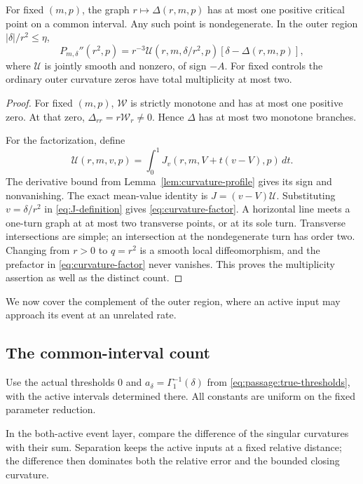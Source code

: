 \begin{proposition}\label{prop:one-fold-graph}
For fixed \((m,p)\), the graph \(r\mapsto\Delta(r,m,p)\) has at most
one positive critical point on a common interval. Any such point
is nondegenerate. In the outer region \(|\delta|/r^2\le\eta\),
\begin{equation}\label{eq:curvature-factor}
 P_{m,\delta}''(r^2,p)
 =r^{-3}\mathcal U(r,m,\delta/r^2,p)
                  [\delta-\Delta(r,m,p)],
\end{equation}
where \(\mathcal U\) is jointly smooth and nonzero, of sign \(-A\).
For fixed controls the ordinary outer curvature zeros have total
multiplicity at most two.
\end{proposition}

\begin{proof}
For fixed \((m,p)\), \(\mathcal W\) is strictly monotone and has
at most one positive zero. At that zero,
\(\Delta_{rr}=r\mathcal W_r\ne0\). Hence \(\Delta\) has at most
two monotone branches.

For the factorization, define
\[
 \mathcal U(r,m,v,p)
  =\int_0^1J_v(r,m,V+t(v-V),p)\,dt .
\]
The derivative bound from Lemma~\ref{lem:curvature-profile}
gives its sign and nonvanishing. The exact mean-value identity is
\(J=(v-V)\mathcal U\). Substituting
\(v=\delta/r^2\) in \eqref{eq:J-definition} gives
\eqref{eq:curvature-factor}.
A horizontal line meets a one-turn graph at at most two transverse
points, or at its sole turn. Transverse intersections are simple;
an intersection at the nondegenerate turn has order two.
Changing from \(r>0\) to \(q=r^2\) is a smooth local diffeomorphism,
and the prefactor in \eqref{eq:curvature-factor} never vanishes.
This proves the multiplicity assertion as well as the distinct count.
\end{proof}

We now cover the complement of the outer region, where an active input
may approach its event at an unrelated rate.

\subsection{The common-interval count}\label{sec:inner}

Use the actual thresholds $0$ and $a_\delta=\Gamma_1^{-1}(\delta)$
from \eqref{eq:passage:true-thresholds}, with the active intervals determined
there. All constants are uniform on the fixed parameter reduction.

In the both-active event layer, compare the difference of the singular
curvatures with their sum. Separation keeps the active inputs at a fixed
relative distance; the difference then dominates both the relative error
and the bounded closing curvature.

